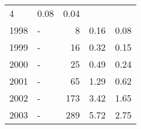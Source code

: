 \begin{longtable}{lXrrr}
       \num{4} &
       \num[round-mode=places,round-precision=2]{0.08} &
         \num[round-mode=places,round-precision=2]{0.04} \\

     1998 &
     \multicolumn{1}{X}{ -  } &


       \num{8} &
       \num[round-mode=places,round-precision=2]{0.16} &
         \num[round-mode=places,round-precision=2]{0.08} \\

     1999 &
     \multicolumn{1}{X}{ -  } &


       \num{16} &
       \num[round-mode=places,round-precision=2]{0.32} &
         \num[round-mode=places,round-precision=2]{0.15} \\

     2000 &
     \multicolumn{1}{X}{ -  } &


       \num{25} &
       \num[round-mode=places,round-precision=2]{0.49} &
         \num[round-mode=places,round-precision=2]{0.24} \\

     2001 &
     \multicolumn{1}{X}{ -  } &


       \num{65} &
       \num[round-mode=places,round-precision=2]{1.29} &
         \num[round-mode=places,round-precision=2]{0.62} \\

     2002 &
     \multicolumn{1}{X}{ -  } &


       \num{173} &
       \num[round-mode=places,round-precision=2]{3.42} &
         \num[round-mode=places,round-precision=2]{1.65} \\

     2003 &
     \multicolumn{1}{X}{ -  } &


       \num{289} &
       \num[round-mode=places,round-precision=2]{5.72} &
         \num[round-mode=places,round-precision=2]{2.75} \\


\end{longtable}
